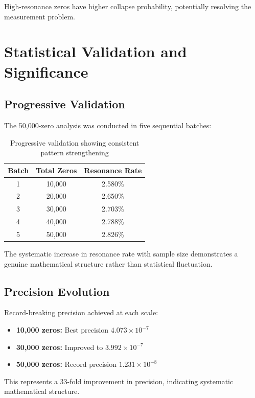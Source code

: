 \documentclass[12pt, a4paper]{article}
\begin{document}
High-resonance zeros have higher collapse probability, potentially resolving the measurement problem.

\section{Statistical Validation and Significance}

\subsection{Progressive Validation}
The 50,000-zero analysis was conducted in five sequential batches:

\begin{table}[h]
\centering
\begin{tabular}{@{}ccc@{}}
\toprule
\textbf{Batch} & \textbf{Total Zeros} & \textbf{Resonance Rate} \\
\midrule
1 & 10,000 & 2.580\% \\
2 & 20,000 & 2.650\% \\
3 & 30,000 & 2.703\% \\
4 & 40,000 & 2.788\% \\
5 & 50,000 & 2.826\% \\
\bottomrule
\end{tabular}
\caption{Progressive validation showing consistent pattern strengthening}
\end{table}

The systematic increase in resonance rate with sample size demonstrates a genuine mathematical structure rather than statistical fluctuation.

\subsection{Precision Evolution}
Record-breaking precision achieved at each scale:

\begin{itemize}
    \item \textbf{10,000 zeros:} Best precision $4.073 \times 10^{-7}$
    \item \textbf{30,000 zeros:} Improved to $3.992 \times 10^{-7}$
    \item \textbf{50,000 zeros:} Record precision $1.231 \times 10^{-8}$
\end{itemize}

This represents a 33-fold improvement in precision, indicating systematic mathematical structure.
\end{document}
